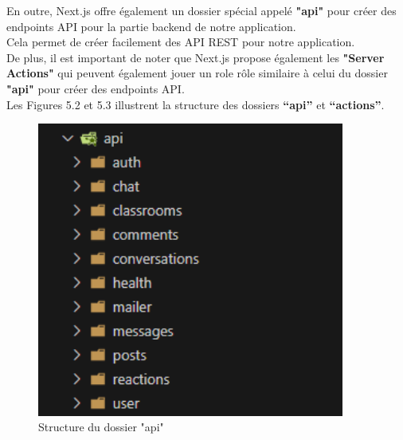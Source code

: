 \newpage
\noindent En outre, Next.js offre également un dossier spécial appelé \textbf{"api"} pour créer des endpoints API pour la partie backend de notre application.\\
Cela permet de créer facilement des API REST pour notre application.\\
De plus, il est important de noter que Next.js propose également les \textbf{"Server Actions"} qui peuvent également jouer un role rôle similaire à celui du dossier \textbf{"api"} pour créer des endpoints API.\\
Les Figures 5.2 et 5.3 illustrent la structure des dossiers \textbf{“api”} et \textbf{“actions”}.
\begin{figure}[H]
    \centering
    \begin{minipage}[b]{0.45\textwidth}
        \centering
        \includegraphics[width=0.9\textwidth,height=0.9\textwidth]{images/chp5/fig2.png}
        \caption{Structure du dossier "api"}
        \label{fig:Structure du dossier "api"}
    \end{minipage}
    \hspace{0.05\textwidth}
    \begin{minipage}[b]{0.45\textwidth}
        \centering

\end{minipage}
\end{figure}
